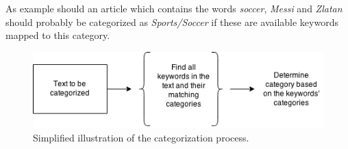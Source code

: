 As example should an article which contains the words \emph{soccer}, \emph{Messi} and \emph{Zlatan} should probably be categorized as \emph{Sports/Soccer} if these are available keywords mapped to this category.   



\begin{figure}[h]
\centering
\includegraphics[width=\textwidth]{Chapters/Introduction/categorizetext}
\caption{Simplified illustration of the categorization process.}
\label{fig:categorizetext}
\end{figure}

